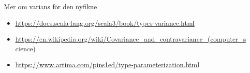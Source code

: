 \begin{Slide}{Mer om varians för den nyfikne}
\begin{itemize}\SlideFontSmall
  \item \href{https://docs.scala-lang.org/scala3/book/types-variance.html}{https://docs.scala-lang.org/scala3/book/types-variance.html}
  \item \href{https://en.wikipedia.org/wiki/Covariance_and_contravariance_(computer_science)}{https://en.wikipedia.org/wiki/Covariance\_and\_contravariance\_(computer\_science)}
  \item \href{https://www.artima.com/pins1ed/type-parameterization.html}{https://www.artima.com/pins1ed/type-parameterization.html}

\end{itemize}
\end{Slide}





